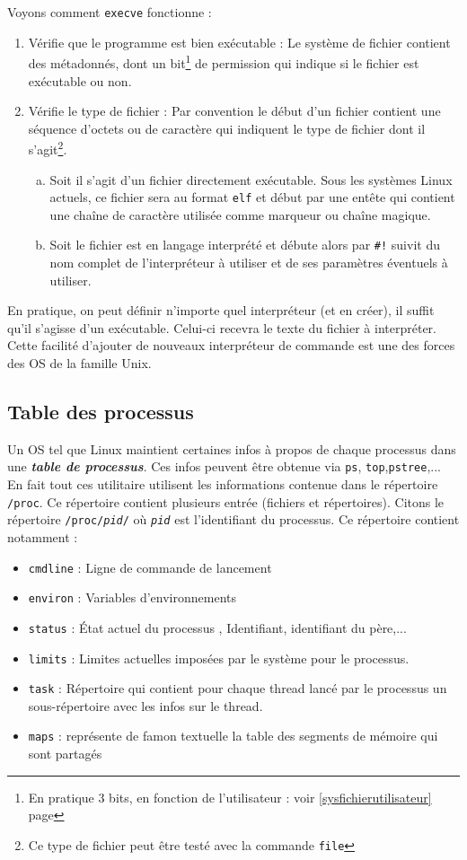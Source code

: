 Voyons comment \texttt{execve} fonctionne :
\begin{enumerate}
  \item Vérifie que le programme est bien exécutable : Le système de fichier contient des métadonnés, dont un bit\footnote{En pratique 3 bits, en fonction de l'utilisateur : voir \ref{sysfichierutilisateur} page \pageref{sysfichierutilisateur}} de permission qui indique si le fichier est exécutable ou non.
  \item Vérifie le type de fichier : Par convention le début d'un fichier contient une séquence d'octets ou de caractère qui indiquent le type de fichier dont il s'agit\footnote{Ce type de fichier peut être testé avec la commande \texttt{file}}.
    \begin{enumerate}[a)]
      \item Soit il s'agit d'un fichier directement exécutable.
        Sous les systèmes Linux actuels, ce fichier sera au format \texttt{elf}
        et début par une entête qui contient une chaîne de caractère
        utilisée comme marqueur ou chaîne magique.
      \item Soit le fichier est en langage interprété et débute alors par \texttt{\#!} suivit du nom complet de l'interpréteur à utiliser et de ses paramètres éventuels à utiliser.
    \end{enumerate}
\end{enumerate}
En pratique, on peut définir n'importe quel interpréteur (et en créer), il suffit qu'il s'agisse d'un exécutable. Celui-ci recevra le texte du fichier à interpréter. Cette facilité d'ajouter de nouveaux interpréteur de commande est une des forces des OS de la famille Unix.

\subsection{Table des processus}
Un OS tel que Linux maintient certaines infos à propos de chaque processus dans une \textbf{\textit{table de processus}}. Ces infos peuvent être obtenue via \texttt{ps}, \texttt{top},\texttt{pstree},... En fait tout ces utilitaire utilisent les informations contenue dans le répertoire \texttt{/proc}. Ce répertoire contient plusieurs entrée (fichiers et répertoires). Citons le répertoire \texttt{/proc/\textit{pid}/} où \texttt{\textit{pid}} est l'identifiant du processus. Ce répertoire contient notamment :
\begin{itemize}
  \item \texttt{cmdline} : Ligne de commande de lancement
  \item \texttt{environ} : Variables d'environnements
  \item \texttt{status} : État actuel du processus , Identifiant, identifiant du père,...
  \item \texttt{limits} : Limites actuelles imposées par le système pour le processus.
  \item \texttt{task} : Répertoire qui contient pour chaque thread lancé par le processus un sous-répertoire avec les infos sur le thread.
  \item \texttt{maps} : représente de famon textuelle la table des segments de mémoire qui sont partagés
\end{itemize}

